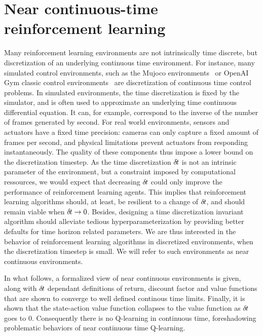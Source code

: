 \section{Near continuous-time reinforcement learning}
\label{sec:framework}

Many reinforcement learning environments are not intrinsically time
discrete, but discretization of an underlying continuous time
environment. For instance, many simulated control environments, such as
the Mujoco environments~\cite{ddpg} or OpenAI Gym classic control
environments~\cite{gym} are discretization of continuous time control
problems.  In simulated environments, the time discretization is fixed by
the simulator, and is often used to approximate an underlying time
continuous differential equation.  It can, for example, correspond to the
inverse of the number of frames generated by second.  For real world
environments, sensors and actuators have a fixed time precision: cameras
can only capture a fixed amount of frames per second, and physical
limitations prevent actuators from responding instantaneously. The
quality of these components thus impose a lower bound on the
discretization timestep. As the time discretization ${\delta\hspace{-.1em}t}$ is not an
intrinsic parameter of the environment, but a constraint imposed by
computational ressources, we would expect that decreasing ${\delta\hspace{-.1em}t}$ could
only improve the performance of reinforcement learning agents.  This
implies that reinforcement learning algorithms should, at least, be
resilient to a change of ${\delta\hspace{-.1em}t}$, and should remain viable when
${\delta\hspace{-.1em}t} \rightarrow 0$. Besides, designing a time discretization
invariant algorithm should alleviate tedious hyperparameterization by
providing better defaults for time horizon related parameters.  We are
thus interested in the behavior of reinforcement learning algorithms in
discretized environments, when the discretization timestep is small. We
will refer to such environments as near continuous environments.

In what follows, a formalized view of near continuous environments is
given, along with ${\delta\hspace{-.1em}t}$ dependant definitions of return, discount
factor and value functions that are shown to converge to well defined
continous time limits. Finally, it is shown that the state-action value
function collapses to the value function as ${\delta\hspace{-.1em}t}$ goes to $0$.
Consequently there is no Q-learning in continuous time, foreshadowing
problematic behaviors of near continuous time Q-learning.

